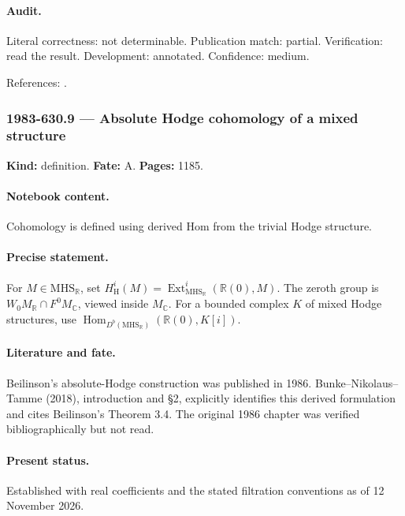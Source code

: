 \paragraph{Audit.} Literal correctness: not determinable. Publication match: partial. Verification: read the result. Development: annotated. Confidence: medium.

\noindent References: \citep{bunkenikolaustamme2018regulator}.\par

\subsubsection{1983-630.9 --- Absolute Hodge cohomology of a mixed structure}

\label{item:1983-630.9}

\noindent\textbf{Kind:} definition. \textbf{Fate:} A. \textbf{Pages:} 1185.\par

\paragraph{Notebook content.} Cohomology is defined using derived Hom from the trivial Hodge structure.

\paragraph{Precise statement.} For \(M\in\mathrm{MHS}_{\mathbb R}\), set \(H^i_{\mathrm H}(M)=\operatorname{Ext}^i_{\mathrm{MHS}_{\mathbb R}}(\mathbb R(0),M)\). The zeroth group is \(W_0M_{\mathbb R}\cap F^0M_{\mathbb C}\), viewed inside \(M_{\mathbb C}\). For a bounded complex \(K\) of mixed Hodge structures, use \(\operatorname{Hom}_{D^b(\mathrm{MHS}_{\mathbb R})}(\mathbb R(0),K[i])\).

\paragraph{Literature and fate.} Beilinson’s absolute-Hodge construction was published in 1986. Bunke–Nikolaus–Tamme (2018), introduction and \S2, explicitly identifies this derived formulation and cites Beilinson’s Theorem 3.4. The original 1986 chapter was verified bibliographically but not read.

\paragraph{Present status.} Established with real coefficients and the stated filtration conventions as of 12 November 2026.

